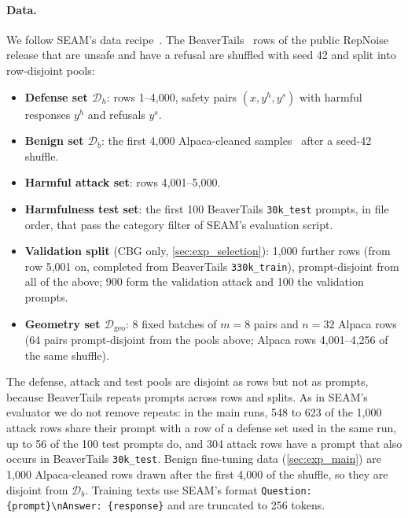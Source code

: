 \documentclass[11pt]{article}
\begin{document}
\paragraph{Data.}
We follow SEAM's data recipe~\citep{wang2026seam}. The BeaverTails~\citep{ji2023beavertails} rows of the public RepNoise release that are unsafe and have a refusal are shuffled with seed 42 and split into row-disjoint pools:
\begin{itemize}
  \item \textbf{Defense set $\mathcal D_h$}: rows 1--4{,}000, safety pairs $(x, y^h, y^s)$ with harmful responses $y^h$ and refusals $y^s$.
  \item \textbf{Benign set $\mathcal D_b$}: the first 4{,}000 Alpaca-cleaned samples~\citep{taori2023alpaca} after a seed-42 shuffle.
  \item \textbf{Harmful attack set}: rows 4{,}001--5{,}000.
  \item \textbf{Harmfulness test set}: the first 100 BeaverTails \texttt{30k\_test} prompts, in file order, that pass the category filter of SEAM's evaluation script.
  \item \textbf{Validation split} (CBG only, \cref{sec:exp_selection}): 1{,}000 further rows (from row 5{,}001 on, completed from BeaverTails \texttt{330k\_train}), prompt-disjoint from all of the above; 900 form the validation attack and 100 the validation prompts.
  \item \textbf{Geometry set $\mathcal D_{\mathrm{geo}}$}: 8 fixed batches of $m=8$ pairs and $n=32$ Alpaca rows (64 pairs prompt-disjoint from the pools above; Alpaca rows 4{,}001--4{,}256 of the same shuffle).
\end{itemize}
The defense, attack and test pools are disjoint as rows but not as prompts, because BeaverTails repeats prompts across rows and splits. As in SEAM's evaluator we do not remove repeats: in the main runs, 548 to 623 of the 1{,}000 attack rows share their prompt with a row of a defense set used in the same run, up to 56 of the 100 test prompts do, and 304 attack rows have a prompt that also occurs in BeaverTails \texttt{30k\_test}. Benign fine-tuning data (\cref{sec:exp_main}) are 1{,}000 Alpaca-cleaned rows drawn after the first 4{,}000 of the shuffle, so they are disjoint from $\mathcal D_b$. Training texts use SEAM's format \texttt{Question: \{prompt\}\textbackslash nAnswer: \{response\}} and are truncated to 256 tokens.
\end{document}
